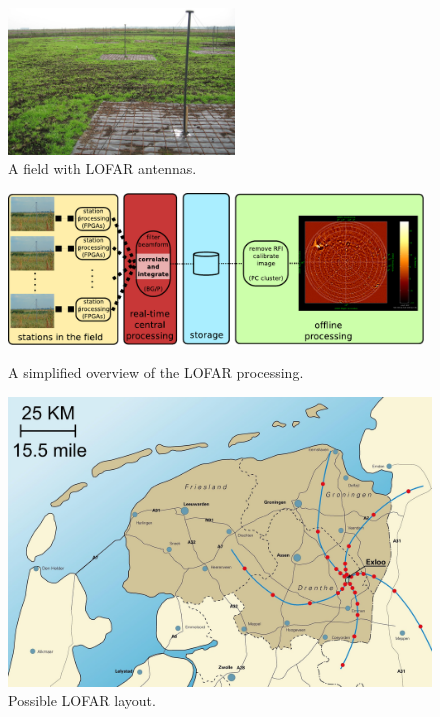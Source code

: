 \documentclass{article}
\begin{document}
\begin{figure}[h]
\vspace{-0.4cm}
\begin{center}
\includegraphics[width=60mm]{figures/LBA-field.jpg}
\end{center}
\vspace{-0.5cm}
\caption{A field with LOFAR antennas.}
\label{fig:lba-field}
\end{figure}

\begin{figure}[t]
\begin{minipage}[b]{11cm}
\includegraphics[width=11cm]{figures/lofar-overview.pdf}
\caption{A simplified overview of the LOFAR processing.}
\label{fig:lofar-overview}
\end{minipage}
\hfill
\begin{minipage}[b]{55mm}
\includegraphics[width=\columnwidth]{figures/map.jpg}
\caption{Possible LOFAR layout.}
\label{fig:map}
\end{minipage}
\end{figure}
\end{document}
